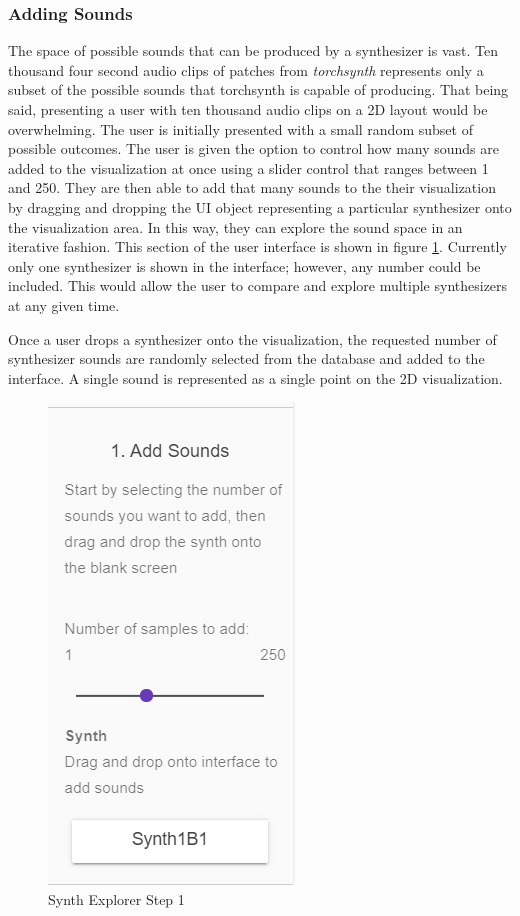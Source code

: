 \subsubsection{Adding Sounds}
The space of possible sounds that can be produced by a synthesizer is vast. Ten thousand four second audio clips of patches from \textit{torchsynth} represents only a subset of the possible sounds that torchsynth is capable of producing. That being said, presenting a user with ten thousand audio clips on a 2D layout would be overwhelming. The user is initially presented with a small random subset of possible outcomes. The user is given the option to control how many sounds are added to the visualization at once using a slider control that ranges between 1 and 250. They are then able to add that many sounds to the their visualization by dragging and dropping the UI object representing a particular synthesizer onto the visualization area. In this way, they can explore the sound space in an iterative fashion. This section of the user interface is shown in figure \ref{fig:steup 1}. Currently only one synthesizer is shown in the interface; however, any number could be included. This would allow the user to compare and explore multiple synthesizers at any given time. 

Once a user drops a synthesizer onto the visualization, the requested number of synthesizer sounds are randomly selected from the database and added to the interface. A single sound is represented as a single point on the 2D visualization.

\begin{figure}
    \centering
    \includegraphics[width=0.2\linewidth]{SynthExplore_AddSounds.png}
    \caption{Synth Explorer Step 1}
    \label{fig:steup 1}
\end{figure}

